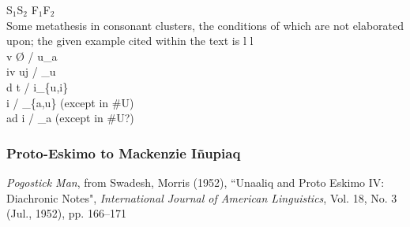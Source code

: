 \documentclass[11pt]{article}
\begin{document}
S$_1$S$_2$ \textrightarrow\hspace{0pt} F$_1$F$_2$\\
Some metathesis in consonant clusters, the conditions of which are not elaborated upon; the given example cited within the text is l \textrightarrow\hspace{0pt} l \\
v \textrightarrow\hspace{0pt} \O\hspace{0pt} / u_a \\
iv \textrightarrow\hspace{0pt} uj / _u \\
d \textrightarrow\hspace{0pt} t / i_\{u,i\} \\
 \textrightarrow\hspace{0pt} i / _\{a,u\} (except in \#U) \\
ad \textrightarrow\hspace{0pt} i / _a (except in \#U?)

\subsubsection{Proto-Eskimo to Mackenzie I\~{n}upiaq}{\it Pogostick Man}, from Swadesh, Morris (1952), \textquotedblleft Unaaliq and Proto Eskimo IV: Diachronic Notes", \textit{International Journal of American Linguistics}, Vol. 18, No. 3 (Jul., 1952), pp. 166--171
\end{document}
